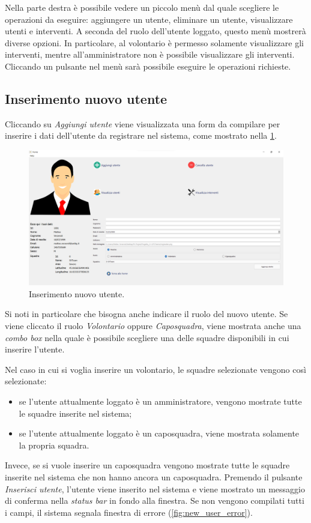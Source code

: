 Nella parte destra è possibile vedere un piccolo menù dal quale scegliere le operazioni da eseguire: aggiungere un utente, eliminare un utente, visualizzare utenti e interventi. A seconda del ruolo dell'utente loggato, questo menù mostrerà diverse opzioni. In particolare, al volontario è permesso solamente visualizzare gli interventi, mentre all'amministratore non è possibile visualizzare gli interventi. Cliccando un pulsante nel menù sarà possibile eseguire le operazioni richieste.

\subsection{Inserimento nuovo utente}
Cliccando su \textit{Aggiungi utente} viene visualizzata una form da compilare per inserire i dati dell'utente da registrare nel sistema, come mostrato nella \Fig\ref{fig:new_user}. 
\begin{figure}[h!]
	\centering
	\includegraphics[width=1\linewidth]{./ImageFiles/new_user}
	\caption{Inserimento nuovo utente.}
	\label{fig:new_user}
\end{figure}

Si noti in particolare che bisogna anche indicare il ruolo del nuovo utente. Se viene cliccato il ruolo \textit{Volontario} oppure \textit{Caposquadra}, viene mostrata anche una \textit{combo box} nella quale è possibile scegliere una delle squadre disponibili in cui inserire l'utente.

Nel caso in cui si voglia inserire un volontario, le squadre selezionate vengono così selezionate: 
\begin{itemize}
	\item se l'utente attualmente loggato è un amministratore, vengono mostrate tutte le squadre inserite nel sistema;
	\item se l'utente attualmente loggato è un caposquadra, viene mostrata solamente la propria squadra.
\end{itemize}
Invece, se si vuole inserire un caposquadra vengono mostrate tutte le squadre inserite nel sistema che non hanno ancora un caposquadra.
Premendo il pulsante \textit{Inserisci utente}, l'utente viene inserito nel sistema e viene mostrato un messaggio di conferma nella \textit{status bar} in fondo alla finestra. Se non vengono compilati tutti i campi, il sistema segnala finestra di errore (\Fig\ref{fig:new_user_error}). 

